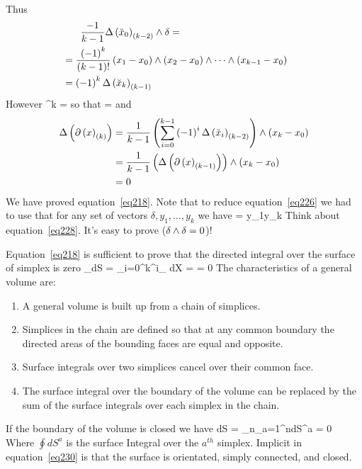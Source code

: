 Thus
\begin{align}
\bfrac{-1}{k-1}\Delta\chn{\breve{x}_{0}}{k-2}\w\delta &= \\
                                                      &\hspace{-1.5in}= \bfrac{\paren{-1}^{k}}{\paren{k-1}!}\paren{x_{1}-x_{0}}\W\paren{x_{2}-x_{0}}\W\cdots\W\paren{x_{k-1}-x_{0}} \\
                                                      &\hspace{-1.5in}= \paren{-1}^{k}\Delta\chn{\breve{x}_{k}}{k-1}
\end{align}
However
\be
{}^{k}\Delta{} = \Delta{}\w\delta
\ee
so that
\be\label{eq226}
 = \Delta{}\w{}
\ee
and
\begin{align}
\Delta\left ( {\partial\left ( {x} \right )_{\left ( {k} \right )}} \right ) &=\displaystyle\frac{1}{k-1}\left ( {\sum_{i=0}^{k-1}\left ( {-1} \right )^{i}\Delta\left ( {\breve{x}_{i}} \right )_{\left ( {k-2} \right )}} \right )
                                   \wedge\left ( {x_{k}-x_{0}} \right ) \nonumber \\
                                 &= \displaystyle\frac{1}{k-1}\left ( {\Delta\left ( {\partial\left ( {x} \right )_{\left ( {k-1} \right )}} \right )} \right )
                                     \wedge\left ( {x_{k}-x_{0}} \right ) \nonumber \\
                                 &= 0
\end{align}
We have proved equation~\ref{eq218}.  Note that to reduce equation~\ref{eq226} we had to use that for any set of vectors $\delta,y_{1},\dots,y_{k}$ we have
\be\label{eq228}
\delta\w{}\w\cdots\w{} = \delta\w y_{1}\w\cdots\w y_{k}
\ee
Think about equation~\ref{eq228}. It's easy to prove ($\delta\wedge \delta = 0$)!

Equation~\ref{eq218} is sufficient to prove that the directed integral over the surface of simplex is
zero
\be
\oint_{\partial{}}dS = \sum_{i=0}^{k}^{i}\int_{}
                                              \hspace{-0.5in}dX = \Delta{} = 0
\ee
The characteristics of a general volume are:
\begin{enumerate}
\item A general volume is built up from a chain of simplices.
\item Simplices in the chain are defined so that at any common boundary the directed
 areas of the bounding faces are equal and opposite.
\item Surface integrals over two simplices cancel over their common face.
\item The surface integral over the boundary of the volume can be replaced by the sum
of the surface integrals over each simplex in the chain.
\end{enumerate}
If the boundary of the volume is closed we have
\be\label{eq230}
\oint dS = \lim_{n\mapsto\infty}\sum_{a=1}^{n}\oint dS^{a} = 0 
\ee
Where $\oint dS^{a}$ is the surface Integral over the $a^{th}$ simplex. Implicit
in equation~\ref{eq230} is that the surface is orientated, simply connected, and 
closed.

